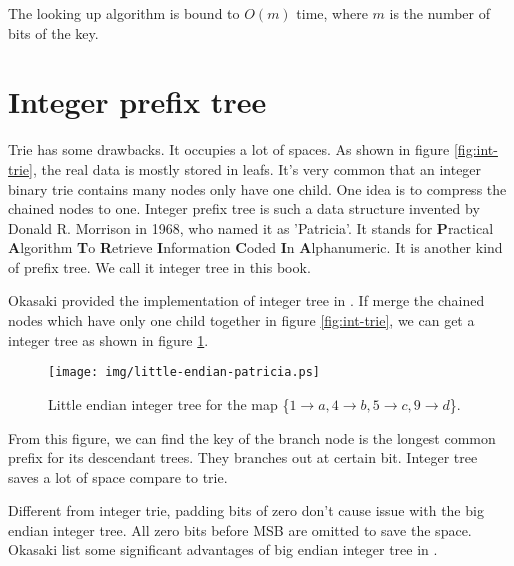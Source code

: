 \documentclass{article}
\begin{document}
The looking up algorithm is bound to $O(m)$ time, where $m$ is the
number of bits of the key.

\section{Integer prefix tree}
\label{int-patricia}

Trie has some drawbacks. It occupies a lot of
spaces. As shown in figure \ref{fig:int-trie}, the real data is mostly stored in leafs.
It's very common that an integer binary trie contains many nodes only have one child.
One idea is to compress the chained nodes to one.
Integer prefix tree is such a data structure invented by
Donald R. Morrison in 1968, who named it as 'Patricia'. It stands for \textbf{P}ractical \textbf{A}lgorithm \textbf{T}o \textbf{R}etrieve \textbf{I}nformation \textbf{C}oded \textbf{I}n \textbf{A}lphanumeric\cite{patricia-morrison}. It is another kind of prefix tree. We call it integer tree in this book.

Okasaki provided the implementation of integer tree in \cite{okasaki-int-map}.
If merge the chained nodes which have only one child together in figure \ref{fig:int-trie}, we can get a integer tree as shown in figure \ref{fig:little-endian-patricia}.

\begin{figure}[htbp]
  \centering
  \texttt{[image: img/little-endian-patricia.ps]}
  \caption{Little endian integer tree for the map
     \{$ 1 \rightarrow a, 4 \rightarrow b, 5 \rightarrow c, 9 \rightarrow d$\}.}
  \label{fig:little-endian-patricia}
\end{figure}

From this figure, we can find the key of the branch node is the
longest common prefix for its descendant trees.
They branches out at certain bit. Integer tree saves a lot of space compare
to trie.

Different from integer trie, padding bits of zero don't cause issue
with the big endian integer tree. All zero bits before MSB are omitted to
save the space. Okasaki list some significant advantages of big endian
integer tree in \cite{okasaki-int-map}.

\end{document}

